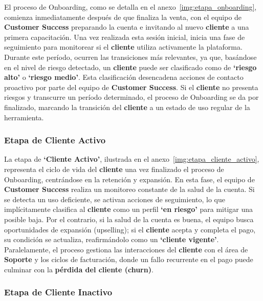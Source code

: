El proceso de Onboarding, como se detalla en el anexo~\ref{img:etapa_onboarding}, comienza inmediatamente después de que finaliza la venta, con el equipo de \textbf{Customer Success} preparando la cuenta e invitando al nuevo \textbf{cliente} a una primera capacitación. Una vez realizada esta sesión inicial, inicia una fase de seguimiento para monitorear si el \textbf{cliente} utiliza activamente la plataforma. Durante este período, ocurren las transiciones más relevantes, ya que, basándose en el nivel de riesgo detectado, un \textbf{cliente} puede ser clasificado como de \textbf{`riesgo alto'} o \textbf{`riesgo medio'}. Esta clasificación desencadena acciones de contacto proactivo por parte del equipo de \textbf{Customer Success}. Si el \textbf{cliente} no presenta riesgos y transcurre un período determinado, el proceso de Onboarding se da por finalizado, marcando la transición del \textbf{cliente} a un estado de uso regular de la herramienta.

\subsubsection{Etapa de Cliente Activo}

La etapa de \textbf{`Cliente Activo'}, ilustrada en el anexo~\ref{img:etapa_cliente_activo}, representa el ciclo de vida del \textbf{cliente} una vez finalizado el proceso de Onboarding, centrándose en la retención y expansión. En esta fase, el equipo de \textbf{Customer Success} realiza un monitoreo constante de la salud de la cuenta. Si se detecta un uso deficiente, se activan acciones de seguimiento, lo que implícitamente clasifica al \textbf{cliente} como un perfil \textbf{`en riesgo'} para mitigar una posible baja. Por el contrario, si la salud de la cuenta es buena, el equipo busca oportunidades de expansión (upselling); si el \textbf{cliente} acepta y completa el pago, su condición se actualiza, reafirmándolo como un \textbf{`cliente vigente'}. Paralelamente, el proceso gestiona las interacciones del \textbf{cliente} con el área de \textbf{Soporte} y los ciclos de facturación, donde un fallo recurrente en el pago puede culminar con la \textbf{pérdida del cliente (churn)}.

\subsubsection{Etapa de Cliente Inactivo}

